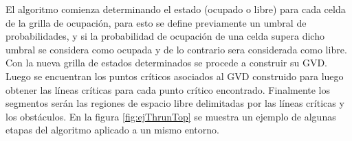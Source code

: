 El algoritmo comienza determinando el estado (ocupado o libre) para cada celda de la grilla de ocupación, para esto se define previamente un umbral de probabilidades, y si la probabilidad de ocupación de una celda supera dicho umbral se considera como ocupada y de lo contrario sera considerada como libre. Con la nueva grilla de estados determinados se procede a construir su  GVD. Luego se encuentran los puntos críticos asociados al GVD construido para luego obtener las líneas críticas para cada punto crítico encontrado. Finalmente los segmentos serán las regiones de espacio libre delimitadas por las líneas críticas y los obstáculos. En la figura \ref{fig:ejThrunTop} se muestra un ejemplo de algunas etapas del algoritmo aplicado a un mismo entorno.

\begin{figure}[H]
  \centering
  \qquad
  \qquad
  \qquad

\end{figure}
